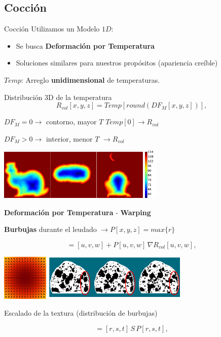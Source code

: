 \documentclass[spanish,unknownkeysallowed,10pt]{beamer}
\begin{document}
\subsection{Cocción}

\begin{frame}{Cocción}
Utilizamos un Modelo $1D$:
\begin{itemize}
\item Se busca \textbf{Deformación por Temperatura}
\item Soluciones similares para nuestros propósitos (apariencia creíble)
\end{itemize}

$Temp$: Arreglo \textbf{unidimensional} de temperaturas.

Distribución 3D de la temperatura
\begin{equation*}
\displaystyle R_{vol}[x,y,z] = Temp[ round( DF_{M}[x,y,z] ) ], 
\end{equation*}

$DF_{M} = 0 \rightarrow$ contorno, mayor $T$ $Temp[0] \rightarrow R_{vol}$

$DF_{M} > 0 \rightarrow$ interior, menor $T$  $\rightarrow R_{vol}$

\centerline{\includegraphics[width=8cm]{../figures/tempsbunny}}
\end{frame}

\begin{frame}{}
\textbf{Deformación por Temperatura} - \textbf{Warping}


\textbf{Burbujas} durante el leudado $\rightarrow P[x,y,z] = max \bigg\{r\bigg\}$

\begin{equation*}
[r,s,t] = [u,v,w] + P[u,v,w] \, \nabla R_{vol}[u,v,w],
\end{equation*}

\includegraphics[width=2.2cm]{../figures/gradient}
\includegraphics[width=7cm]{../figures/parameterp}

Escalado de la textura (distribución de burbujas)

\begin{equation*}
[x,y,z] = [r,s,t]\, S \, P[r,s,t],
\end{equation*}

\end{frame}
\end{document}
